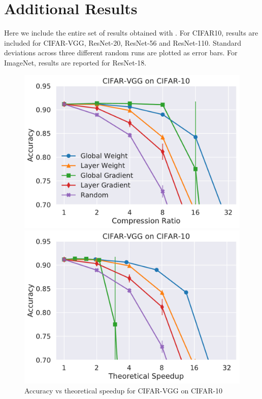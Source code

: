 
\section{Additional Results} \label{apx:res}


Here we include the entire set of results obtained with \SB.
%
For CIFAR10, results are included for CIFAR-VGG, ResNet-20, ResNet-56 and ResNet-110. Standard deviations across three different random runs are plotted as error bars.
%
For ImageNet, results are reported for ResNet-18.

\clearpage

\begin{figure}
\begin{minipage}[b]{.45\textwidth}
\centering
\includegraphics[width=\linewidth]{shrinkbench/VGG-CIFAR_CIFAR10_comp}
\end{minipage}
\hfill
\begin{minipage}[b]{.45\textwidth}
\centering
\includegraphics[width=\linewidth]{shrinkbench/VGG-CIFAR_CIFAR10_flops}
\caption{Accuracy vs theoretical speedup for CIFAR-VGG on CIFAR-10}
\end{minipage}
\end{figure}



